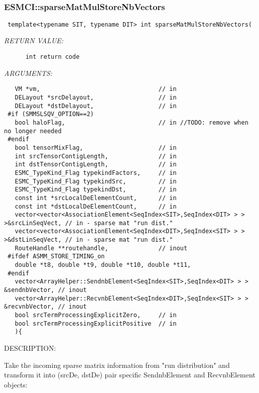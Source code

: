  
\mbox{}\hrulefill\
 
\subsubsection [ESMCI::sparseMatMulStoreNbVectors] {ESMCI::sparseMatMulStoreNbVectors}


  
\begin{verbatim} template<typename SIT, typename DIT> int sparseMatMulStoreNbVectors(\end{verbatim}{\em RETURN VALUE:}
\begin{verbatim}      int return code\end{verbatim}{\em ARGUMENTS:}
\begin{verbatim}   VM *vm,                                 // in
   DELayout *srcDelayout,                  // in
   DELayout *dstDelayout,                  // in
 #if (SMMSLSQV_OPTION==2)
   bool haloFlag,                          // in //TODO: remove when no longer needed
 #endif
   bool tensorMixFlag,                     // in
   int srcTensorContigLength,              // in
   int dstTensorContigLength,              // in
   ESMC_TypeKind_Flag typekindFactors,     // in
   ESMC_TypeKind_Flag typekindSrc,         // in
   ESMC_TypeKind_Flag typekindDst,         // in
   const int *srcLocalDeElementCount,      // in
   const int *dstLocalDeElementCount,      // in
   vector<vector<AssociationElement<SeqIndex<SIT>,SeqIndex<DIT> > > >&srcLinSeqVect, // in - sparse mat "run dist."
   vector<vector<AssociationElement<SeqIndex<DIT>,SeqIndex<SIT> > > >&dstLinSeqVect, // in - sparse mat "run dist."
   RouteHandle **routehandle,              // inout
 #ifdef ASMM_STORE_TIMING_on
   double *t8, double *t9, double *t10, double *t11,
 #endif
   vector<ArrayHelper::SendnbElement<SeqIndex<SIT>,SeqIndex<DIT> > > &sendnbVector, // inout
   vector<ArrayHelper::RecvnbElement<SeqIndex<DIT>,SeqIndex<SIT> > > &recvnbVector, // inout
   bool srcTermProcessingExplicitZero,     // in
   bool srcTermProcessingExplicitPositive  // in
   ){\end{verbatim}
{\sf DESCRIPTION:\\ }


      Take the incoming sparse matrix information from "run distribution" and
      transform it into (srcDe, dstDe) pair specific SendnbElement and
      RecvnbElement objects:
  
